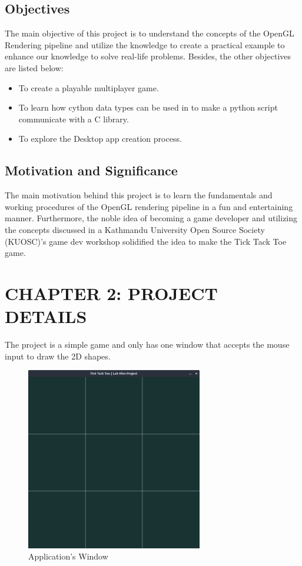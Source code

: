\documentclass[12pt]{article}
\begin{document}
\subsection{Objectives}
The main objective of this project is to understand the concepts of the OpenGL Rendering pipeline and utilize the knowledge to create a practical example to enhance our knowledge to solve real-life problems. Besides, the other objectives are listed below:
\begin{itemize}
    \item To create a playable multiplayer game.
    \item To learn how cython data types can be used in to make a python script communicate with a C library.
    \item To explore the Desktop app creation process.
\end{itemize}

\subsection{Motivation and Significance}
The main motivation behind this project is to learn the fundamentals and working procedures of the OpenGL rendering pipeline in a fun and entertaining manner. Furthermore, the noble idea of becoming a game developer and utilizing the concepts discussed in
a Kathmandu University Open Source Society (KUOSC)'s game dev workshop solidified the idea to make the Tick Tack Toe game.
\clearpage
\section{CHAPTER 2: PROJECT DETAILS}
The project is a simple game and only has one window that accepts the mouse input to draw the 2D shapes.\\


\begin{figure}[h]
    \centerline{\includegraphics[height=80mm]{InitialWindow.png}}
    \caption{Application's Window}
    \label{fig}
\end{figure}
\end{document}
